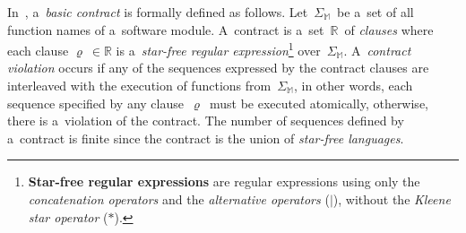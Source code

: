 In~\cite{contracts2017, contracts2015}, a~\emph{basic contract} is
formally defined as follows. Let~$ \Sigma_\mathbb{M} $~be a~set of all
function names of a~software module. A~contract is
a~set~$ \mathbb{R} $~of \emph{clauses} where each clause
$ \varrho\ \in \mathbb{R} $ is a~\emph{star-free regular
expression}\footnote{\textbf{Star-free regular expressions} are
regular expressions using only the \emph{concatenation operators}
and the \emph{alternative operators} ($ | $), without the
\emph{Kleene star operator} ($ * $).} over~$ \Sigma_\mathbb{M} $.
A~\emph{contract violation} occurs if any of the sequences expressed by
the contract clauses are interleaved with the execution of functions
from~$ \Sigma_\mathbb{M} $, in other words, each sequence specified by
any clause~$ \varrho $~must be executed atomically, otherwise, there
is a~violation of the contract. The number of sequences defined by
a~contract is finite since the contract is the union of
\emph{star-free languages}.

